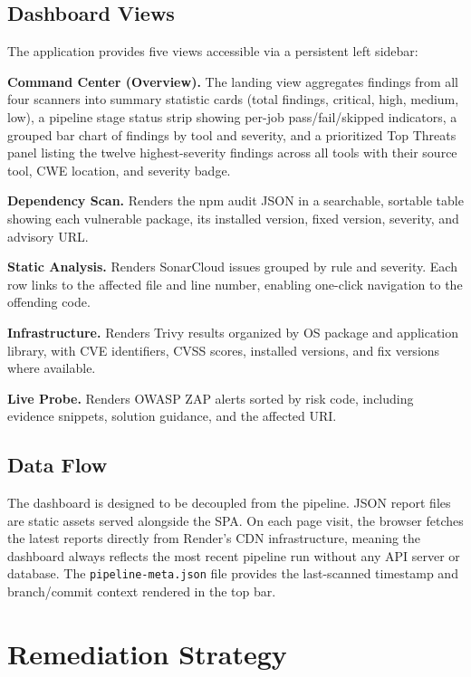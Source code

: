 \documentclass[10pt,conference]{IEEEtran}
\begin{document}
\subsection{Dashboard Views}

The application provides five views accessible via a persistent left sidebar:

\textbf{Command Center (Overview).}
The landing view aggregates findings from all four scanners into summary
statistic cards (total findings, critical, high, medium, low), a pipeline
stage status strip showing per-job pass/fail/skipped indicators, a grouped
bar chart of findings by tool and severity, and a prioritized Top Threats
panel listing the twelve highest-severity findings across all tools with
their source tool, CWE location, and severity badge.

\textbf{Dependency Scan.}
Renders the npm audit JSON in a searchable, sortable table showing each
vulnerable package, its installed version, fixed version, severity, and
advisory URL.

\textbf{Static Analysis.}
Renders SonarCloud issues grouped by rule and severity.
Each row links to the affected file and line number, enabling one-click
navigation to the offending code.

\textbf{Infrastructure.}
Renders Trivy results organized by OS package and application library,
with CVE identifiers, CVSS scores, installed versions, and fix versions
where available.

\textbf{Live Probe.}
Renders OWASP ZAP alerts sorted by risk code, including evidence snippets,
solution guidance, and the affected URI.

\subsection{Data Flow}

The dashboard is designed to be decoupled from the pipeline.
JSON report files are static assets served alongside the SPA.
On each page visit, the browser fetches the latest reports directly from
Render's CDN infrastructure, meaning the dashboard always reflects the
most recent pipeline run without any API server or database.
The \texttt{pipeline-meta.json} file provides the last-scanned timestamp and
branch/commit context rendered in the top bar.

\section{Remediation Strategy}
\end{document}
